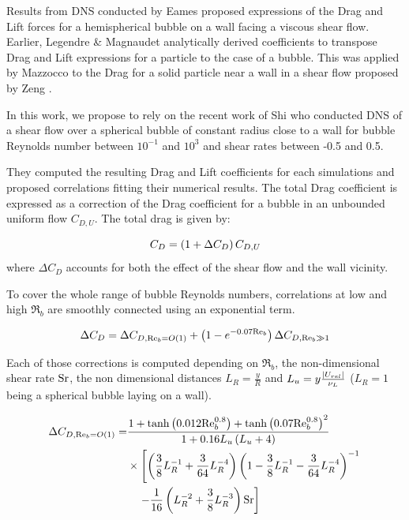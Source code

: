 Results from DNS conducted by Eames \etal \cite{eames_lift_2008} proposed expressions of the Drag and Lift forces for a hemispherical bubble on a wall facing a viscous shear flow. Earlier, Legendre \& Magnaudet \cite{legendre_lift_1998} analytically derived coefficients to transpose Drag and Lift expressions for a particle to the case of a bubble. This was applied by Mazzocco \etal \cite{mazzocco_reassessed_2018} to the Drag for a solid particle near a wall in a shear flow proposed by Zeng \etal \cite{zeng_forces_2009}.

In this work, we propose to rely on the recent work of Shi \etal \cite{shi_drag_2021} who conducted DNS of a shear flow over a spherical bubble of constant radius close to a wall for bubble Reynolds number between $10^{-1}$ and $10^{3}$ and shear rates between -0.5 and 0.5.

They computed the resulting Drag and Lift coefficients for each simulations and proposed correlations fitting their numerical results. The total Drag coefficient is expressed as a correction of the Drag coefficient for a bubble in an unbounded uniform flow  $C_{D,U}$. The total drag is given by:

\begin{equation}
C_{D}=\left( 1+\Delta C_{D} \right)C_{D,U}
\end{equation}
where $\Delta C_{D}$ accounts for both the effect of the shear flow and the wall vicinity. 

To cover the whole range of bubble Reynolds numbers, correlations at low and high $\Re_{b}$ are smoothly connected using an exponential term.

\begin{equation}
\Delta C_{D}=\Delta C_{D,\mathrm{Re}_{b}=O\left( 1 \right)}+\left( 1-e^{-0.07\mathrm{Re}_{b}} \right)\Delta C_{D,{\mathrm{Re}_{b}\gg 1}}
\label{eq:drag_corr_shi}
\end{equation}


Each of those corrections is computed depending on $\Re_{b}$,  the non-dimensional shear rate $\mathrm{Sr}$, the non dimensional distances $L_{R} = \frac{y}{R}$ and $L_{u}= y \frac{\left| U_{rel} \right|}{\nu_{L}}$  ($L_{R}=1$ being a spherical bubble laying on a wall). 


\begin{align}
\nonumber \Delta C_{D,\Re_{b}=O\parth{1}} = & \frac{1+\mathrm{tanh}\parth{0.012\Re_{b}^{0.8}} + \mathrm{tanh}\parth{0.07\Re_{b}^{0.8}}^{2}}{1+0.16L_{u}\parth{L_{u}+4}}
 \\
%
\nonumber &\times \left[ \left(\frac{3}{8}L_{R}^{-1} + \frac{3}{64}L_{R}^{-4}\right) \left(1- \frac{3}{8}L_{R}^{-1}-\frac{3}{64}L_{R}^{-4}\right)^{-1} \right.\\
&\left. \quad - \frac{1}{16}\left(L_{R}^{-2}+\frac{3}{8}L_{R}^{-3}\right)\text{Sr} \right]
\end{align}



